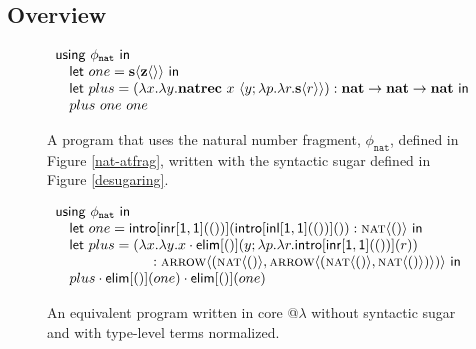 \subsection{Overview}\label{programs}
\begin{figure}[t]
\small
$
\begin{array}{l}
{\sf using}~ \phi_{\texttt{nat}}~{\sf in}~\\
\quad {\sf let}~one = {\textbf{s}}\langle{\textbf{z}}\langle\rangle\rangle~{\sf in}~\\
\quad {\sf let}~plus = (\lambda x.\lambda y.{\textbf{natrec}}~x~\langle y; \lambda p.\lambda r.{\textbf{s}}\langle r\rangle\rangle) : {\textbf{nat}} \rightarrow {\textbf{nat}} \rightarrow {\textbf{nat}}~{\sf in}~\\
\quad plus~one~one
\end{array}
$
\caption{\small A program that uses the natural number fragment, $\phi_\texttt{nat}$, defined in Figure \ref{nat-atfrag}, written with the syntactic sugar defined in Figure \ref{desugaring}.}
\label{nat-sugared}
\end{figure}
\begin{figure}[t]
\small
$
\begin{array}{l}
{\sf using}~ \phi_{\texttt{nat}}~{\sf in}~\\
\quad {\sf let}~one = {\sf intro}[{\sf inr}[\textsf{1},\textsf{1}](())]({\sf intro}[{\sf inl}[\textsf{1},\textsf{1}](())]()) : \textsc{nat}\langle()\rangle~{\sf in}~\\
\quad {\sf let}~plus = (\lambda x.\lambda y.x\cdot{\sf elim}[()](y; \lambda p.\lambda r.{\sf intro}[{\sf inr}[\textsf{1},\textsf{1}](())](r)) \\\quad\quad\quad\quad\quad\quad\quad :\textsc{arrow}\langle(\textsc{nat}\langle()\rangle, \textsc{arrow}\langle(\textsc{nat}\langle()\rangle, \textsc{nat}\langle()\rangle)\rangle)\rangle~{\sf in}~\\
\quad plus\cdot{\sf elim}[()](one)\cdot{\sf elim}[()](one)
\end{array}
$
\caption{\small An equivalent program written in core @$\lambda$ without syntactic sugar and with type-level terms normalized.}
\label{nat-desugared}
\end{figure}
